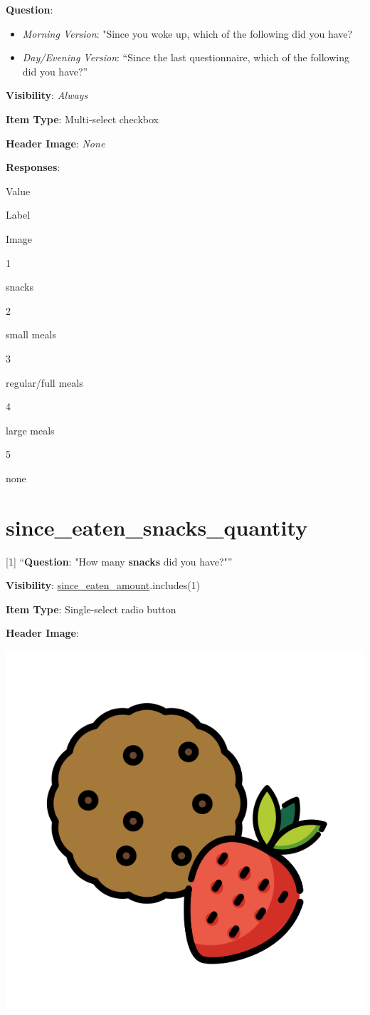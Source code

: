 \documentclass[]{book}
\providecommand{\tightlist}{%
  \setlength{\itemsep}{0pt}\setlength{\parskip}{0pt}}
\begin{document}
\textbf{Question}:

\begin{itemize}
\tightlist
\item
  \emph{Morning Version}: "Since you woke up, which of the following did you have?
\item
  \emph{Day/Evening Version}: ``Since the last questionnaire, which of the following did you have?''
\end{itemize}

\textbf{Visibility}: \emph{Always}

\textbf{Item Type}: Multi-select checkbox

\textbf{Header Image}: \emph{None}

\textbf{Responses}:

Value

Label

Image

1

snacks

2

small meals

3

regular/full meals

4

large meals

5

none

\hypertarget{since_eaten_snacks_quantity}{%
\section{since\_eaten\_snacks\_quantity}\label{since_eaten_snacks_quantity}}

{[}1{]} ``\textbf{Question}: "How many \textbf{snacks} did you have?"''

\textbf{Visibility}: \protect\hyperlink{since_eaten_amount}{since\_eaten\_amount}.includes(1)

\textbf{Item Type}: Single-select radio button

\textbf{Header Image}:

\begin{flushleft}\includegraphics[width=0.33\linewidth]{downloadFigs4latex_NIMH_Applet_Codebook/since_eaten_snacks_quantity_headerImg} \end{flushleft}
\end{document}
